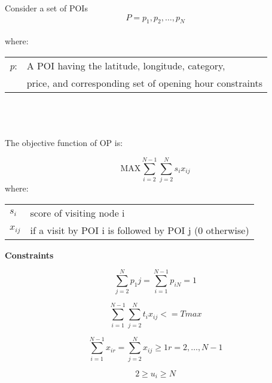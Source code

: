 


\setlength{\tabcolsep}{20pt}

Consider a set of POIs \[P = {p_1,p_2,\ldots,p_N}\]
\\
where:
\\

\begin{tabular}{l l}


\textit{p}:  &  A POI having the latitude, longitude, category,\\
 & price, and corresponding set of opening hour constraints \\
\end{tabular}
\\
\\
\\

The objective function of OP is:

\[ \text{MAX}  \sum_{i=2}^{N-1} \sum_{j=2}^{N} {s_i}{x_{ij}} \]
where:
\\
\begin{tabular}{l l}
\textit{$s_i$} & score of visiting node i \\
\textit{$x_{ij}$} & if a visit by POI i is followed by POI j (0 otherwise)\\

\end{tabular}

\pagebreak

\textbf{Constraints} 

\begin{multicols}{2}
\begin{equation} 
    \label{constraintOne}
    \sum_{j=2}^{N} p_1j = \sum_{i=1}^{N-1} p_{iN}= 1
\end{equation}

\begin{equation} 
    \label{constraintTwo}
    \sum_{i=1}^{N-1} \sum_{j=2}^{N} t_{i}x_{ij}<= Tmax
\end{equation}


\end{multicols}

\begin{multicols}{2}

\begin{equation} 
    \label{constraintThree}
    \sum_{i=1}^{N-1} x_{ir} = \sum_{j=2}^{N} x_{ij} \geq 1  r = 2, \ldots, N-1
\end{equation}

\begin{equation} 
    \label{constraintFour}
    2 \geq u_i \geq N 
\end{equation}
\end{multicols}

